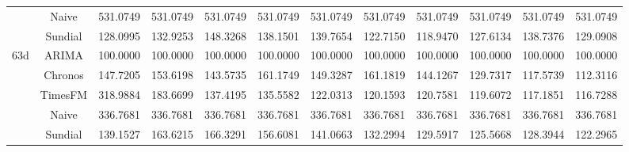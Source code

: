 \begin{table}[H]
{\begin{tabular}{cccccccccccc}
 & Naive & 531.0749 & 531.0749 & 531.0749 & 531.0749 & 531.0749 & 531.0749 & 531.0749 & 531.0749 & 531.0749 & 531.0749 \\
 & Sundial & 128.0995 & 132.9253 & 148.3268 & 138.1501 & 139.7654 & 122.7150 & 118.9470 & 127.6134 & 138.7376 & 129.0908 \\
\midrule
\multirow[c]{5}{*}{63d} & ARIMA & 100.0000 & 100.0000 & 100.0000 & 100.0000 & 100.0000 & 100.0000 & 100.0000 & 100.0000 & 100.0000 & 100.0000 \\
 & Chronos & 147.7205 & 153.6198 & 143.5735 & 161.1749 & 149.3287 & 161.1819 & 144.1267 & 129.7317 & 117.5739 & 112.3116 \\
 & TimesFM & 318.9884 & 183.6699 & 137.4195 & 135.5582 & 122.0313 & 120.1593 & 120.7581 & 119.6072 & 117.1851 & 116.7288 \\
 & Naive & 336.7681 & 336.7681 & 336.7681 & 336.7681 & 336.7681 & 336.7681 & 336.7681 & 336.7681 & 336.7681 & 336.7681 \\
 & Sundial & 139.1527 & 163.6215 & 166.3291 & 156.6081 & 141.0663 & 132.2994 & 129.5917 & 125.5668 & 128.3944 & 122.2965 \\
\bottomrule
\end{tabular}

 }
\end{table}